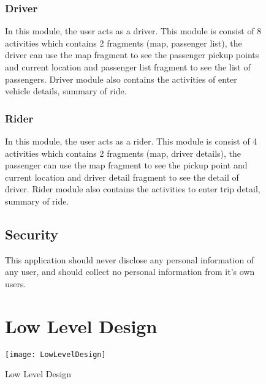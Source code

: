 \begin{figure}
\subsubsection{Driver}
In this module, the user acts as a driver. This module is consist of 8 activities which contains 2 fragments (map, passenger list), the driver can use the map fragment to see the passenger pickup points and current location and passenger list fragment to see the list of passengers. Driver module also contains the activities of enter vehicle details, summary of ride.
\end{figure}

\begin{figure}
\subsubsection{Rider}
In this module, the user acts as a rider. This module is consist of 4 activities  which contains 2 fragments (map, driver details), the passenger can use the map fragment to see the pickup point and current location and driver detail fragment to see the detail of driver. Rider module also contains the activities to enter trip detail, summary of ride.
\end{figure}

\begin{figure}
\subsection{Security} 		
This application should never disclose any personal information of any user, and should collect no personal information from it's own users.
\end{figure}

\begin{figure}
\section{Low Level Design} 
\texttt{[image: LowLevelDesign]}
\caption{Low Level Design}
\label{fig:Low Level Design}
\center
\end{figure}

